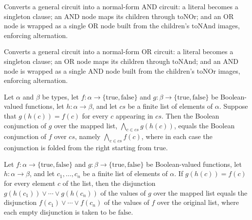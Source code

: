 \begin{definition}
\label{BoolCircuit.TreeCircuit.toNAnd}
\leanok
{}
Converts a general circuit into a normal-form AND circuit: a literal becomes a singleton
clause; an AND node maps its children through $\mathrm{toNOr}$; and an OR node is wrapped
as a single OR node built from the children's $\mathrm{toNAnd}$ images, enforcing
alternation.
\end{definition}

\begin{definition}
\label{BoolCircuit.TreeCircuit.toNOr}
\leanok
{}
Converts a general circuit into a normal-form OR circuit: a literal becomes a singleton
clause; an OR node maps its children through $\mathrm{toNAnd}$; and an AND node is wrapped
as a single AND node built from the children's $\mathrm{toNOr}$ images, enforcing
alternation.
\end{definition}

\begin{theorem}
\label{BoolCircuit.foldr_and_map}
\leanok
{}
Let $\alpha$ and $\beta$ be types, let
$f\colon\alpha\to\{\mathrm{true},\mathrm{false}\}$ and
$g\colon\beta\to\{\mathrm{true},\mathrm{false}\}$ be Boolean-valued functions, let
$h\colon\alpha\to\beta$, and let $cs$ be a finite list of elements of $\alpha$. Suppose
that $g(h(c)) = f(c)$ for every $c$ appearing in $cs$. Then the Boolean conjunction of
$g$ over the mapped list, $\bigwedge_{c\in cs} g(h(c))$, equals the Boolean conjunction
of $f$ over $cs$, namely $\bigwedge_{c\in cs} f(c)$, where in each case the conjunction
is folded from the right starting from $\mathrm{true}$.
\end{theorem}

\begin{theorem}
\label{BoolCircuit.foldr_or_map}
\leanok
{}
Let $f : \alpha \to \{\text{true},\text{false}\}$ and $g : \beta \to
\{\text{true},\text{false}\}$ be Boolean-valued functions, let $h : \alpha \to \beta$,
and let $c_1, \dots, c_n$ be a finite list of elements of $\alpha$. If $g(h(c)) = f(c)$
for every element $c$ of the list, then the disjunction $g(h(c_1)) \vee \cdots \vee
g(h(c_n))$ of the values of $g$ over the mapped list equals the disjunction $f(c_1) \vee
\cdots \vee f(c_n)$ of the values of $f$ over the original list, where each empty
disjunction is taken to be $\text{false}$.
\end{theorem}

